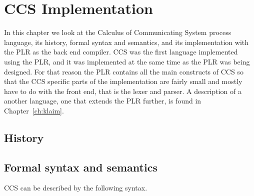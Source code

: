 \chapter{CCS Implementation}

In this chapter we look at the Calculus of Communicating System process language, its history, formal syntax and semantics, and its implementation with the PLR as the back end compiler. CCS was the first language implemented using the PLR, and it was implemented at the same time as the PLR was being designed. For that reason the PLR contains all the main constructs of CCS so that the CCS specific parts of the implementation are fairly small and mostly have to do with the front end, that is the lexer and parser. A description of a another language, one that extends the PLR further, is found in Chapter~\ref{ch:klaim}.

\section{History}

\section{Formal syntax and semantics}\label{sec:ccs_syntax}

CCS can be described by the following syntax.

